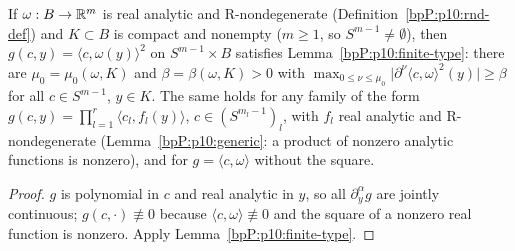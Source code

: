 \begin{corollary}\label{bpP:p10:cp09-lemma1}
If $\omega:B\to\mathbb{R}^m$ is real analytic and R-nondegenerate (Definition~\ref{bpP:p10:rnd-def}) and $K\subset B$ is compact and nonempty ($m\ge1$, so $S^{m-1}\ne\emptyset$), then $g(c,y)=\langle c,\omega(y)\rangle^2$ on $S^{m-1}\times B$ satisfies Lemma~\ref{bpP:p10:finite-type}: there are $\mu_0=\mu_0(\omega,K)$ and $\beta=\beta(\omega,K)>0$ with $\max_{0\le\nu\le\mu_0}\lvert\partial^\nu\langle c,\omega\rangle^2(y)\rvert\ge\beta$ for all $c\in S^{m-1}$, $y\in K$. The same holds for any family of the form $g(c,y)=\prod_{l=1}^r\langle c_l,f_l(y)\rangle$, $c\in(S^{m_l-1})_l$, with $f_l$ real analytic and R-nondegenerate (Lemma~\ref{bpP:p10:generic}: a product of nonzero analytic functions is nonzero), and for $g=\langle c,\omega\rangle$ without the square.
\end{corollary}
\begin{proof}
$g$ is polynomial in $c$ and real analytic in $y$, so all $\partial^\alpha_yg$ are jointly continuous; $g(c,\cdot)\not\equiv0$ because $\langle c,\omega\rangle\not\equiv0$ and the square of a nonzero real function is nonzero. Apply Lemma~\ref{bpP:p10:finite-type}.
\end{proof}

